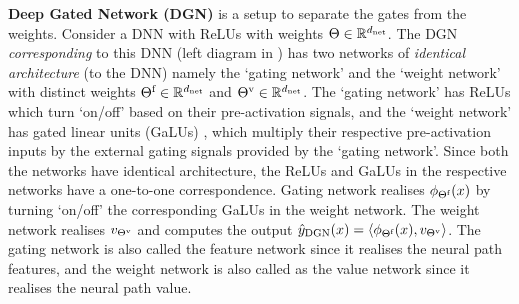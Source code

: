 \textbf{Deep Gated Network (DGN)} is a setup to separate the gates from the weights. Consider a DNN with ReLUs with weights $\Theta\in\mathbb{R}^{d_{\text{net}}}$. The DGN \emph{corresponding} to this DNN (left diagram in ) has two networks of \emph{identical architecture} (to the DNN) namely the `gating network' and the `weight network' with distinct weights $\Theta^{\textrm{f}}\in\mathbb{R}^{d_{\text{net}}}$ and ${\Theta}^{\text{v}}\in\mathbb{R}^{d_{\text{net}}}$.  
The `gating network' has ReLUs which turn `on/off' based on their pre-activation signals, and the `weight network' has gated linear units (GaLUs) \citep{sss,npk}, which multiply their respective pre-activation inputs by the external gating signals provided by the `gating network'.  Since both the networks have identical architecture, the ReLUs and GaLUs in the respective networks have a one-to-one correspondence.  Gating network realises $\phi_{\Theta^{\textrm{f}}}(x)$ by turning `on/off' the corresponding GaLUs in the weight network. The weight network realises $v_{{\Theta}^{\text{v}}}$ and computes the output $\hat{y}_{\text{DGN}}(x)=\langle \phi_{\Theta^{\textrm{f}}}(x),v_{{\Theta}^{\text{v}}}\rangle$.  The gating network is also called the feature network since it realises the neural path features, and the weight network is also called as the value network since it realises the neural path value. %



